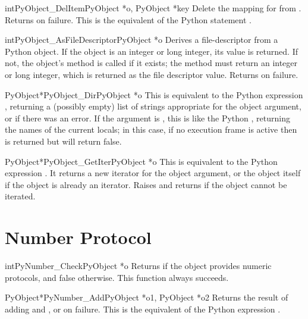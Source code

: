 \begin{cfuncdesc}{int}{PyObject_DelItem}{PyObject *o, PyObject *key}
  Delete the mapping for  from .  Returns  on
  failure. This is the equivalent of the Python statement .
\end{cfuncdesc}

\begin{cfuncdesc}{int}{PyObject_AsFileDescriptor}{PyObject *o}
  Derives a file-descriptor from a Python object.  If the object is an
  integer or long integer, its value is returned.  If not, the
  object's  method is called if it exists; the method
  must return an integer or long integer, which is returned as the
  file descriptor value.  Returns  on failure.
\end{cfuncdesc}

\begin{cfuncdesc}{PyObject*}{PyObject_Dir}{PyObject *o}
  This is equivalent to the Python expression ,
  returning a (possibly empty) list of strings appropriate for the
  object argument, or \NULL{} if there was an error.  If the argument
  is \NULL, this is like the Python , returning the names
  of the current locals; in this case, if no execution frame is active
  then \NULL{} is returned but  will
  return false.
\end{cfuncdesc}

\begin{cfuncdesc}{PyObject*}{PyObject_GetIter}{PyObject *o}
  This is equivalent to the Python expression .
  It returns a new iterator for the object argument, or the object 
  itself if the object is already an iterator.  Raises
   and returns \NULL{} if the object cannot be
  iterated.
\end{cfuncdesc}


\section{Number Protocol \label{number}}

\begin{cfuncdesc}{int}{PyNumber_Check}{PyObject *o}
  Returns  if the object  provides numeric protocols,
  and false otherwise.  This function always succeeds.
\end{cfuncdesc}


\begin{cfuncdesc}{PyObject*}{PyNumber_Add}{PyObject *o1, PyObject *o2}
  Returns the result of adding  and , or \NULL{} on
  failure.  This is the equivalent of the Python expression
  .
\end{cfuncdesc}


